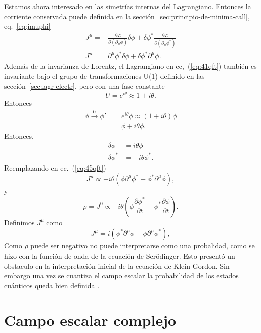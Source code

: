 Estamos ahora interesado en las simetrías internas del Lagrangiano. Entonces la corriente conservada puede definida en la sección~\ref{sec:principio-de-minima-call}, eq.~\eqref{eq:jmuphi}
\begin{align}
  J^\mu=&\frac{\partial\mathcal{L}}{\partial(\partial_\mu\phi)}\delta\phi+\delta\phi^*\frac{\partial\mathcal{L}}{\partial(\partial_\mu\phi^*)}\nonumber\\
  \label{eq:45qft}
  J^\mu=&\partial^\mu\phi^*\delta\phi+\delta\phi^*\partial^\mu\phi.
\end{align}
Además de la invarianza de Lorentz, el Lagrangiano en ec,~(\ref{eq:41qft}) también es invariante bajo el grupo de transformaciones U(1) definido en las sección~\ref{sec:lagr-electr}, pero con una fase constante
\begin{equation*}
  U=e^{i\theta}\approx1+i\theta.
\end{equation*}
Entonces
\begin{align}
  \phi\overset{U}{\longrightarrow}\phi'&=e^{i\theta}\phi\approx(1+i\theta)\phi\nonumber\\
  &=\phi+i\theta\phi.
\end{align}
Entonces,
\begin{align}
  \delta\phi&=i\theta\phi\\
  \delta\phi^*&=-i\theta\phi^*.
\end{align}
Reemplazando en ec.~(\ref{eq:45qft})
\begin{equation}
\label{eq:46qft}
  J^\mu\propto -i\theta(\phi\partial^\mu\phi^*-\phi^*\partial^\mu\phi),
\end{equation}
y
\begin{equation}
\label{eq:47qft}
  \rho=J^0\propto-i\theta(\phi\frac{\partial\phi^*}{\partial t}-\phi^*\frac{\partial\phi}{\partial t}).
\end{equation}
Definimos $J^\mu$ como
\begin{equation}
  \label{eq:48qft}
   J^\mu= i(\phi^*\partial^\mu\phi-\phi\partial^\mu\phi^*),
\end{equation}
Como $\rho$ puede ser negativo no puede interpretarse como una
probalidad, como se hizo con la función de onda de la ecuación de
Scrödinger. Esto presentó un obstaculo en la interpretación inicial de
la ecuación de Klein-Gordon. Sin embargo una vez se cuantiza el
campo escalar la probabilidad de los estados cuánticos queda bien
definida \cite{Gross}. 


\section{Campo escalar complejo}


